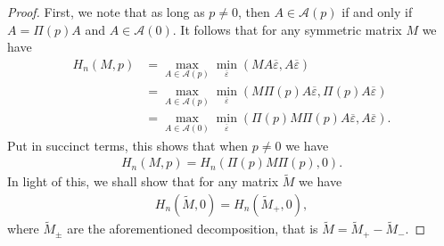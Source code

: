 \documentclass[reqno]{amsart}
\numberwithin{equation}{section}
\begin{document}
\begin{proof}
  First, we note that as long as $p\neq 0$, then $A \in \mathcal{A}(p)$ if and only if $A = \Pi(p)A$ and $A \in \mathcal{A}(0)$. It follows that for any symmetric matrix $M$ we have
  \begin{align*}
    H_n(M,p) & = \max_{A \in \mathcal{A}(p)}\min_{\overline \varepsilon}(MA\overline\varepsilon,A\overline\varepsilon)\\
      & = \max_{A \in \mathcal{A}(p)}\min_{\overline \varepsilon}( M\Pi(p)A\overline\varepsilon,\Pi(p)A\overline\varepsilon)\\
      & = \max_{A\in \mathcal{A}(0)}\min_{\overline \varepsilon}( \Pi(p)M\Pi(p)A\overline\varepsilon,A\overline\varepsilon).
  \end{align*}
  Put in succinct terms, this shows that when $p \neq 0$ we have
  \begin{align*}
    H_n(M,p) = H_n(\Pi(p)M\Pi(p),0).   
  \end{align*}
  In light of this, we shall show that for any matrix $\tilde M$ we have
  \begin{align*} 
    H_n(\tilde M,0) = H_n(\tilde M_+,0),
  \end{align*}
  where $\tilde M_{\pm}$ are the aforementioned decomposition, that is $\tilde M = \tilde M_+-\tilde M_-$.
  

\end{proof}
\end{document}
